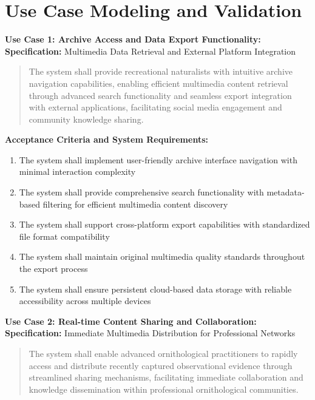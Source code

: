 \section{Use Case Modeling and Validation}

\textbf{Use Case 1: Archive Access and Data Export Functionality:}
\textbf{Specification:} Multimedia Data Retrieval and External Platform Integration

\begin{quote}
The system shall provide recreational naturalists with intuitive archive navigation capabilities, enabling efficient multimedia content retrieval through advanced search functionality and seamless export integration with external applications, facilitating social media engagement and community knowledge sharing.
\end{quote}

\textbf{Acceptance Criteria and System Requirements:}
\begin{enumerate}
    \item The system shall implement user-friendly archive interface navigation with minimal interaction complexity
    \item The system shall provide comprehensive search functionality with metadata-based filtering for efficient multimedia content discovery
    \item The system shall support cross-platform export capabilities with standardized file format compatibility
    \item The system shall maintain original multimedia quality standards throughout the export process
    \item The system shall ensure persistent cloud-based data storage with reliable accessibility across multiple devices
\end{enumerate}

\textbf{Use Case 2: Real-time Content Sharing and Collaboration:}
\textbf{Specification:} Immediate Multimedia Distribution for Professional Networks

\begin{quote}
The system shall enable advanced ornithological practitioners to rapidly access and distribute recently captured observational evidence through streamlined sharing mechanisms, facilitating immediate collaboration and knowledge dissemination within professional ornithological communities.
\end{quote}

